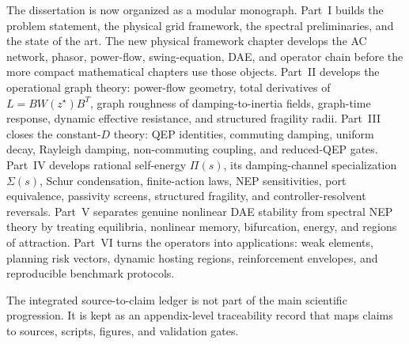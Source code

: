 The dissertation is now organized as a modular monograph. Part~I builds the
problem statement, the physical grid framework, the spectral preliminaries, and
the state of the art. The new physical framework chapter develops the AC
network, phasor, power-flow, swing-equation, DAE, and operator chain before the
more compact mathematical chapters use those objects. Part~II develops the
operational graph theory: power-flow geometry, total derivatives of
\(L=B W(z^\star)B^T\), graph roughness of damping-to-inertia fields,
graph-time response, dynamic effective resistance, and structured fragility
radii. Part~III closes the constant-\(D\) theory: QEP identities, commuting
damping, uniform decay, Rayleigh damping, non-commuting coupling, and
reduced-QEP gates. Part~IV develops rational self-energy \(\Pi(s)\), its
damping-channel specialization \(\Sigma(s)\), Schur condensation,
finite-action laws, NEP sensitivities, port equivalence, passivity screens,
structured fragility, and controller-resolvent reversals. Part~V separates
genuine nonlinear DAE stability from spectral NEP theory by treating
equilibria, nonlinear memory, bifurcation, energy, and regions of attraction.
Part~VI turns the operators into applications: weak elements, planning risk
vectors, dynamic hosting regions, reinforcement envelopes, and reproducible
benchmark protocols.

The integrated source-to-claim ledger is not part of the main scientific
progression. It is kept as an appendix-level traceability record that maps
claims to sources, scripts, figures, and validation gates.
